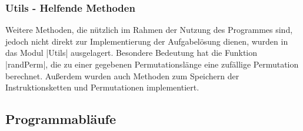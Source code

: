 \subsubsection{Utils - Helfende Methoden}
Weitere Methoden, die nützlich im Rahmen der Nutzung des Programmes sind, jedoch nicht direkt zur Implementierung der Aufgabelösung dienen,
wurden in das Modul |Utils| ausgelagert. Besondere Bedeutung hat die Funktion |randPerm|, die zu einer gegebenen Permutationslänge
eine zufällige Permutation berechnet. %
Außerdem wurden auch Methoden zum Speichern der Instruktionsketten und Permutationen implementiert.

\newpage
\subsection{Programmabläufe}
